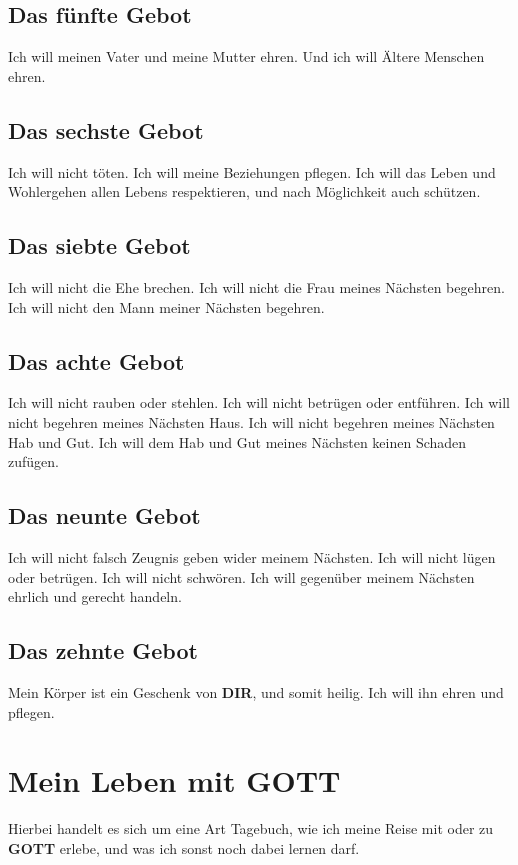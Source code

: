 \documentclass[12pt,a4paper]{article}
\newcommand{\Dir}[0]{\textbf{DIR}}
\newcommand{\Gott}[0]{\textbf{GOTT}}
\begin{document}
	\subsection{Das f\"unfte Gebot}
		Ich will meinen Vater und meine Mutter ehren.
		Und ich will \"Altere Menschen ehren.
			
	\subsection{Das sechste Gebot}
		Ich will nicht t\"oten.
		Ich will meine Beziehungen pflegen.
		Ich will das Leben und Wohlergehen allen Lebens respektieren,
		und nach M\"oglichkeit auch sch\"utzen.
		
	\subsection{Das siebte Gebot}
		Ich will nicht die Ehe brechen.
		Ich will nicht die Frau meines N\"achsten begehren.
		Ich will nicht den Mann meiner N\"achsten begehren.
		
	\subsection{Das achte Gebot}
		Ich will nicht rauben oder stehlen.
		Ich will nicht betr\"ugen oder entf\"uhren.
		Ich will nicht begehren meines N\"achsten Haus.
		Ich will nicht begehren meines N\"achsten Hab und Gut.
		Ich will dem Hab und Gut meines N\"achsten keinen Schaden zuf\"ugen.
		
	\subsection{Das neunte Gebot}
		Ich will nicht falsch Zeugnis geben wider meinem N\"achsten.
		Ich will nicht l\"ugen oder betr\"ugen.
		Ich will nicht schw\"oren.
		Ich will gegen\"uber meinem N\"achsten ehrlich und gerecht handeln.
		
	\subsection{Das zehnte Gebot}
		Mein K\"orper ist ein Geschenk von {\Dir},
		und somit heilig.
		Ich will ihn ehren und pflegen.

	\section{Mein Leben mit {\Gott}} \label{MeinLebenMitGott}
		Hierbei handelt es sich um eine Art Tagebuch,
		wie ich meine Reise mit oder zu {\Gott} erlebe,
		und was ich sonst noch dabei lernen darf.
	
\end{document}
